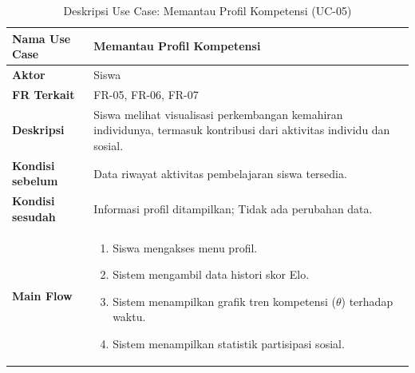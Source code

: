 \begin{table}[H]
    \centering
    \caption{Deskripsi Use Case: Memantau Profil Kompetensi (UC-05)}
    \label{tbl:desc_uc05}
    \begin{tabular}{|p{}|p{}|}
        \hline
        \textbf{Nama Use Case} & \textbf{Memantau Profil Kompetensi} \\
        \hline
        \textbf{Aktor} & Siswa \\
        \hline
        \textbf{FR Terkait} & FR-05, FR-06, FR-07 \\
        \hline
        \textbf{Deskripsi} & Siswa melihat visualisasi perkembangan kemahiran individunya, termasuk kontribusi dari aktivitas individu dan sosial. \\
        \hline
        \textbf{Kondisi sebelum} & Data riwayat aktivitas pembelajaran siswa tersedia. \\
        \hline
        \textbf{Kondisi sesudah} & Informasi profil ditampilkan; Tidak ada perubahan data. \\
        \hline
        \textbf{Main Flow} & \begin{enumerate}[noitemsep,topsep=0pt,leftmargin=*]
            \item Siswa mengakses menu profil.
            \item Sistem mengambil data histori skor Elo.
            \item Sistem menampilkan grafik tren kompetensi ($\theta$) terhadap waktu.
            \item Sistem menampilkan statistik partisipasi sosial.
        \end{enumerate} \\
        \hline
    \end{tabular}
\end{table}